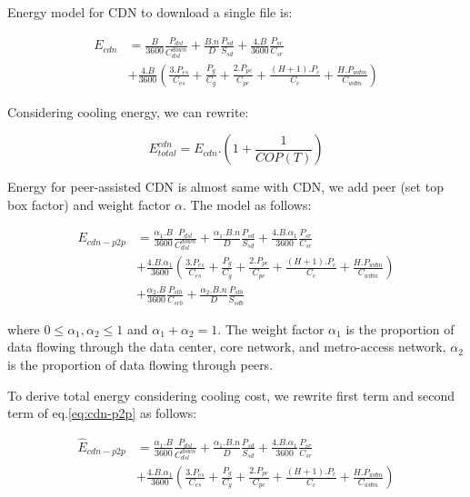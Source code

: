 \documentclass[JIP]{ipsj}
\begin{document}
Energy model for CDN to download a single file is:

\begin{equation}
\begin{split}
	E_{cdn} &= \frac{B}{3600}\frac{P_{dsl}}{C_{dsl}^{down}} + \frac{B.n}{D}\frac{P_{sd}}{S_{sd}} + \frac{4.B}{3600}\frac{P_{sr}}{C_{sr}} \\
	&+ \frac{4.B}{3600} \left( \frac{3.P_{es}}{C_{es}} + \frac{P_g}{C_g} + \frac{2.P_{pe}}{C_{pe}} + \frac{(H+1).P_c}{C_c} + \frac{H.P_{wdm}}{C_{wdm}}  \right)
\end{split}
\end{equation}

Considering cooling energy, we can rewrite:  

\begin{equation}
	E_{total}^{cdn} = E_{cdn}.\left( 1 + \frac{1}{COP(T)} \right)
\end{equation}


Energy for peer-assisted CDN is almost same with CDN, we add peer (set top box factor) and weight factor $\alpha$.
The model as follows:

\begin{equation}\label{eq:cdn-p2p}
\begin{split}
	E_{cdn-p2p} &= \frac{\alpha_1.B}{3600}\frac{P_{dsl}}{C_{dsl}^{down}} + \frac{\alpha_1.B.n}{D}\frac{P_{sd}}{S_{sd}} + \frac{4.B.\alpha_1}{3600}\frac{P_{sr}}{C_{sr}} \\
	&+ \frac{4.B.\alpha_1}{3600} \left( \frac{3.P_{es}}{C_{es}} + \frac{P_g}{C_g} + \frac{2.P_{pe}}{C_{pe}} + \frac{(H+1).P_c}{C_c} + \frac{H.P_{wdm}}{C_{wdm}}  \right) \\
	&+ \frac{\alpha_2.B}{3600}\frac{P_{stb}}{C_{srb}} + \frac{\alpha_2.B.n}{D}\frac{P_{stb}}{S_{sdb}}
\end{split}
\end{equation}

where $0\le \alpha_1,\alpha_2 \le 1$ and $\alpha_1 + \alpha_2 = 1$.
The weight factor $\alpha_1$ is the proportion of data flowing through the data center, core network, and metro-access network, $\alpha_2$ is the proportion of data flowing through peers.

To derive total energy considering cooling cost, we rewrite first term and second term of eq.\ref{eq:cdn-p2p} as follows:

\begin{equation}\label{eq:cdn-p2p-hat}
\begin{split}
	\hat{E}_{cdn-p2p} &= \frac{\alpha_1.B}{3600}\frac{P_{dsl}}{C_{dsl}^{down}} + \frac{\alpha_1.B.n}{D}\frac{P_{sd}}{S_{sd}} + \frac{4.B.\alpha_1}{3600}\frac{P_{sr}}{C_{sr}} \\
&+ \frac{4.B.\alpha_1}{3600} \left( \frac{3.P_{es}}{C_{es}} + \frac{P_g}{C_g} + \frac{2.P_{pe}}{C_{pe}} + \frac{(H+1).P_c}{C_c} + \frac{H.P_{wdm}}{C_{wdm}}  \right)
\end{split}
\end{equation}
\end{document}

